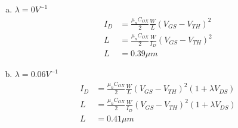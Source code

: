 \documentclass{article}
\begin{document}
\begin{enumerate}[(a)]
\item \(\lambda = 0 V^{-1}\)
\begin{equation*}
\begin{aligned}
I_{D} &= \frac{\mu_{n}C_{OX}}{2}\frac{W}{L}(V_{GS} - V_{TH})^{2} \\
L &= \frac{\mu_{n}C_{OX}}{2}\frac{W}{I_{D}}(V_{GS} - V_{TH})^{2} \\
L &= 0.39 \mu{}m
\end{aligned}
\end{equation*}

\item \(\lambda = 0.06 V^{-1}\)
\begin{equation*}
\begin{aligned}
I_{D} &= \frac{\mu_{n}C_{OX}}{2}\frac{W}{L}(V_{GS} - V_{TH})^{2}(1 + \lambda{}V_{DS}) \\
L &= \frac{\mu_{n}C_{OX}}{2}\frac{W}{I_{D}}(V_{GS} - V_{TH})^{2}(1 + \lambda{}V_{DS}) \\
L &= 0.41 \mu{}m
\end{aligned}
\end{equation*}
\end{enumerate}
\end{document}
